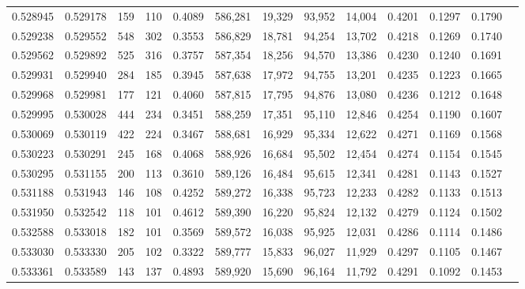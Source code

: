 \begin{tabular}{rrrrrrrrrrrrr}
0.528945 & 0.529178 &   159 &   110 &                                     0.4089 & 586,281 &  19,329 &  93,952 &  14,004 & 0.4201 & 0.1297 & 0.1790 \\
0.529238 & 0.529552 &   548 &   302 &                                     0.3553 & 586,829 &  18,781 &  94,254 &  13,702 & 0.4218 & 0.1269 & 0.1740 \\
0.529562 & 0.529892 &   525 &   316 &                                     0.3757 & 587,354 &  18,256 &  94,570 &  13,386 & 0.4230 & 0.1240 & 0.1691 \\
0.529931 & 0.529940 &   284 &   185 &                                     0.3945 & 587,638 &  17,972 &  94,755 &  13,201 & 0.4235 & 0.1223 & 0.1665 \\
0.529968 & 0.529981 &   177 &   121 &                                     0.4060 & 587,815 &  17,795 &  94,876 &  13,080 & 0.4236 & 0.1212 & 0.1648 \\
0.529995 & 0.530028 &   444 &   234 &                                     0.3451 & 588,259 &  17,351 &  95,110 &  12,846 & 0.4254 & 0.1190 & 0.1607 \\
0.530069 & 0.530119 &   422 &   224 &                                     0.3467 & 588,681 &  16,929 &  95,334 &  12,622 & 0.4271 & 0.1169 & 0.1568 \\
0.530223 & 0.530291 &   245 &   168 &                                     0.4068 & 588,926 &  16,684 &  95,502 &  12,454 & 0.4274 & 0.1154 & 0.1545 \\
0.530295 & 0.531155 &   200 &   113 &                                     0.3610 & 589,126 &  16,484 &  95,615 &  12,341 & 0.4281 & 0.1143 & 0.1527 \\
0.531188 & 0.531943 &   146 &   108 &                                     0.4252 & 589,272 &  16,338 &  95,723 &  12,233 & 0.4282 & 0.1133 & 0.1513 \\
0.531950 & 0.532542 &   118 &   101 &                                     0.4612 & 589,390 &  16,220 &  95,824 &  12,132 & 0.4279 & 0.1124 & 0.1502 \\
0.532588 & 0.533018 &   182 &   101 &                                     0.3569 & 589,572 &  16,038 &  95,925 &  12,031 & 0.4286 & 0.1114 & 0.1486 \\
0.533030 & 0.533330 &   205 &   102 &                                     0.3322 & 589,777 &  15,833 &  96,027 &  11,929 & 0.4297 & 0.1105 & 0.1467 \\
0.533361 & 0.533589 &   143 &   137 &                                     0.4893 & 589,920 &  15,690 &  96,164 &  11,792 & 0.4291 & 0.1092 & 0.1453 \\

\end{tabular}
